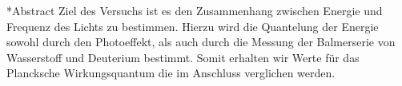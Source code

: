\documentclass[pdftex, a4paper,11pt, twoside, ngerman]{report}
\begin{document}
  
  
  \begin{chapter}*{Abstract}
    Ziel des Versuchs ist es den Zusammenhang zwischen Energie und Frequenz des Lichts zu bestimmen. Hierzu wird die Quantelung der Energie sowohl durch den Photoeffekt, als auch durch die Messung der Balmerserie von Wasserstoff und Deuterium bestimmt. Somit erhalten wir Werte für das Plancksche Wirkungsquantum die im Anschluss verglichen werden. 
  \end{chapter}
  
  \tableofcontents
  
  
  
\end{document}
